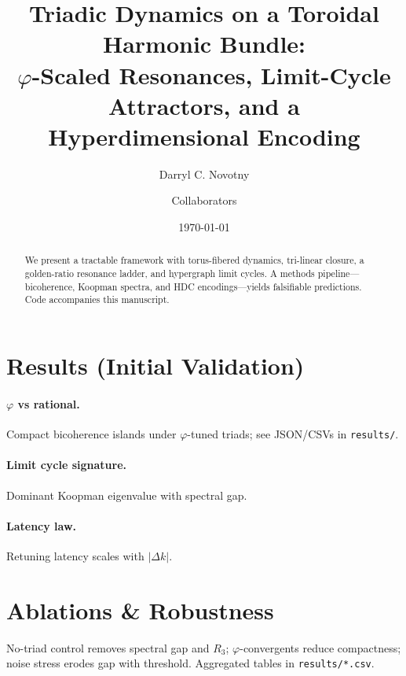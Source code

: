 \documentclass[11pt]{article}
\title{Triadic Dynamics on a Toroidal Harmonic Bundle:\\ \large $\varphi$-Scaled Resonances, Limit-Cycle Attractors, and a Hyperdimensional Encoding}
\author{Darryl C. Novotny \and Collaborators}
\date{\today}
\begin{document}
\maketitle
\begin{abstract}
We present a tractable framework with torus-fibered dynamics, tri-linear closure, a golden-ratio resonance ladder, and hypergraph limit cycles. A methods pipeline---bicoherence, Koopman spectra, and HDC encodings---yields falsifiable predictions. Code accompanies this manuscript.
\end{abstract}
\section{Results (Initial Validation)}
\paragraph{$\varphi$ vs rational.} Compact bicoherence islands under $\varphi$-tuned triads; see JSON/CSVs in \texttt{results/}.
\paragraph{Limit cycle signature.} Dominant Koopman eigenvalue with spectral gap.
\paragraph{Latency law.} Retuning latency scales with $|\Delta k|$.
\section{Ablations \& Robustness}
No-triad control removes spectral gap and $R_3$; $\varphi$-convergents reduce compactness; noise stress erodes gap with threshold. Aggregated tables in \texttt{results/*.csv}.
\end{document}
